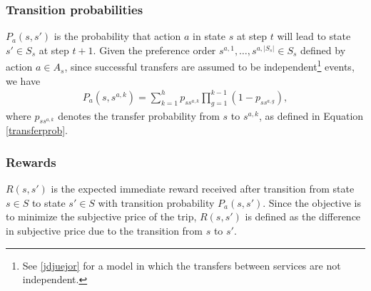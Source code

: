 \documentclass[dissertation,draft*]{aaltoseries}
\begin{document}
\subsubsection{Transition probabilities}
\label{transitiondef}
$P_a(s,s')$ is the probability that action $a$ in state $s$ 
at step $t$ will lead to state $s' \in S_s$ at step $t + 1$. 
Given the preference order $s^{a,1}, \ldots, s^{a,|S_s|} \in S_{s}$ defined by action $a \in A_s$, 
since successful transfers are assumed to be independent\footnote{See \ref{jdjuejor} for a model in which the transfers between services
are not independent.} events, we have 
\begin{align}
\label{ekakaava}
P_a(s,s^{a,k}) 
= \sum_{k=1}^h p_{ss^{a,k}} \prod_{g = 1}^{k-1}(1-p_{ss^{a,g}}),
\end{align}
where $p_{ss^{a,k}}$ denotes the transfer probability from $s$ to $s^{a,k}$, as defined in Equation \eqref{transferprob}.

\subsubsection{Rewards}
\label{rewardsdef}
$R(s,s')$ is the expected immediate reward received after transition from state $s \in S$ to state $s' \in S$ 
with transition probability $P_a(s,s')$. Since the objective is to minimize the subjective price of the trip, $R(s,s')$ is defined 
as the difference in subjective price due to the transition from $s$ to $s'$.
\end{document}
